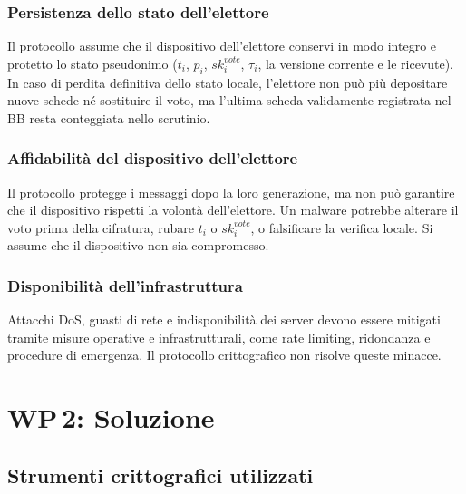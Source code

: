 \documentclass[12pt,a4paper]{article}
\newcommand{\sk}{\mathit{sk}}
\begin{document}
\subsubsection*{Persistenza dello stato dell'elettore}

Il protocollo assume che il dispositivo dell'elettore conservi in modo integro e protetto lo stato pseudonimo ($t_i$, $p_i$, $\sk_i^{\mathit{vote}}$, $\tau_i$, la versione corrente e le ricevute). In caso di perdita definitiva dello stato locale, l'elettore non pu\`o pi\`u depositare nuove schede n\'e sostituire il voto, ma l'ultima scheda validamente registrata nel BB resta conteggiata nello scrutinio.

\subsubsection*{Affidabilit\`a del dispositivo dell'elettore}

Il protocollo protegge i messaggi dopo la loro generazione, ma non pu\`o garantire che il dispositivo rispetti la volont\`a dell'elettore. Un malware potrebbe alterare il voto prima della cifratura, rubare $t_i$ o $\sk_i^{\mathit{vote}}$, o falsificare la verifica locale. Si assume che il dispositivo non sia compromesso.

\subsubsection*{Disponibilit\`a dell'infrastruttura}

Attacchi DoS, guasti di rete e indisponibilit\`a dei server devono essere mitigati tramite misure operative e infrastrutturali, come rate limiting, ridondanza e procedure di emergenza. Il protocollo crittografico non risolve queste minacce.


\section[WP2: Soluzione]{WP\,2: Soluzione}

\subsection{Strumenti crittografici utilizzati}
\end{document}
